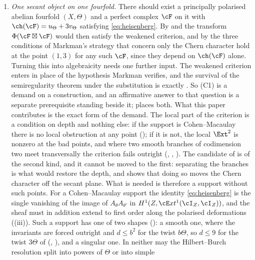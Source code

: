 \begin{enumerate}[label=\textup{(C\arabic*)},leftmargin=3.0em,itemsep=4pt]
\item \emph{One secant object on one fourfold.} There should exist a
  principally polarised abelian fourfold $(X,\Theta)$ and a perfect complex
  $\cF$ on it with $\ch(\cF)=u_{\Theta}+3v_{\Theta}$ satisfying
  \eqref{eq:heisenberg}. By  and 
  the transform $\Phi(\cF\boxtimes\cF)$ would then satisfy the weakened
  criterion, and by  the three conditions of Markman's
  strategy that concern only the Chern character hold at the point $(1,3)$
  for any such $\cF$, since they depend on $\ch(\cF)$ alone. Turning this
  into algebraicity needs one further input. The weakened criterion enters
  in place of the hypothesis Markman verifies, and the survival of the
  semiregularity theorem under the substitution is exactly
  \cite[Question 11.4]{Mar25b}. So (C1) is a demand on a construction, and an affirmative answer to
  that question is a separate prerequisite standing beside it;
   places both. What this paper contributes is the exact
  form of the demand. The local part of the criterion is a condition on depth
  and nothing else: if the support is Cohen--Macaulay there is no local
  obstruction at any point (); if it is not, the local
  $\Ext^{2}$ is nonzero at the bad points, and where two smooth branches of
  codimension two meet transversally the criterion fails outright
  (, ,
  ). The candidate of
  \cite[Section 12]{Mar25b} is of the second kind, and it cannot be moved to
  the first: separating the branches is what would restore the depth, and
   shows that doing so moves the Chern character
  off the secant plane. What is needed is therefore a support without such
  points. For a Cohen--Macaulay support the identity \eqref{eq:heisenberg}
  is the single vanishing of the image of $A_{\theta}A_{\theta'}$ in
  $H^{1}(Z,\cE xt^{1}(\cI_{Z},\cI_{Z}))$, and the sheaf must in addition
  extend to first order along the polarised deformations
  ((iii)). Such a support has one of two
  shapes (): a smooth one, where the invariants are forced
  outright and $d\le b^{2}$ for the twist $b\Theta$, so $d\le9$ for the twist
  $3\Theta$ of  (,
  ), and a singular one. In neither may the
  Hilbert--Burch resolution split into powers of $\Theta$ or into simple

\end{enumerate}
